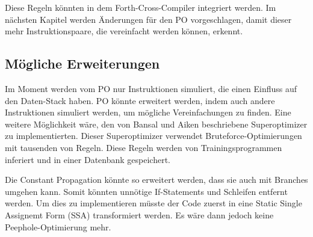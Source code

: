 Diese Regeln könnten in dem Forth-Cross-Compiler integriert werden. Im nächsten Kapitel werden Änderungen für den PO vorgeschlagen, damit dieser mehr Instruktionspaare, die vereinfacht werden können, erkennt.

\subsection{Mögliche Erweiterungen}

Im Moment werden vom PO nur Instruktionen simuliert, die einen Einfluss auf den Daten-Stack haben. PO könnte erweitert werden, indem auch andere Instruktionen simuliert werden, um mögliche Vereinfachungen zu finden. Eine weitere Möglichkeit wäre, den von Bansal und Aiken beschriebene Superoptimizer zu implementierten. Dieser Superoptimizer verwendet Bruteforce-Optimierungen mit tausenden von Regeln. Diese Regeln werden von Trainingsprogrammen inferiert und in einer Datenbank gespeichert.\cite{superoptimizer}

Die Constant Propagation könnte so erweitert werden, dass sie auch mit Branches umgehen kann. Somit könnten unnötige If-Statements und Schleifen entfernt werden. Um dies zu implementieren müsste der Code zuerst in eine Static Single Assignemt Form (SSA) transformiert werden.\cite{ssa} Es wäre dann jedoch keine Peephole-Optimierung mehr.